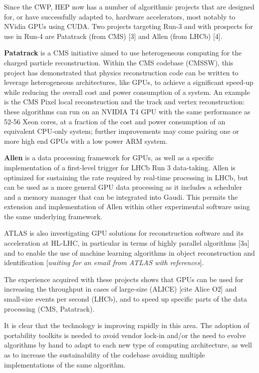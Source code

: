 \documentclass[10pt,a4paper]{article}
\begin{document}
Since the CWP, HEP now has a number of algorithmic projects that are
designed for, or have successfully adapted to, hardware accelerators,
most notably to NVidia GPUs using CUDA. Two projects targeting Run-3 and
with prospects for use in Run-4 are Patatrack (from CMS) {[}3{]} and
Allen (from LHCb) {[}4{]}.

\textbf{Patatrack} is a CMS initiative aimed to use heterogeneous
computing for the charged particle reconstruction. Within the CMS
codebase (CMSSW), this project has demonstrated that physics
reconstruction code can be written to leverage heterogeneous
architectures, like GPUs, to achieve a significant speed-up while
reducing the overall cost and power consumption of a system. An example
is the CMS Pixel local reconstruction and the track and vertex
reconstruction: these algorithms can run on an NVIDIA T4 GPU with the
same performance as 52-56 Xeon cores, at a fraction of the cost and
power consumption of an equivalent CPU-only system; further improvements
may come pairing one or more high end GPUs with a low power ARM system.

\textbf{Allen} is a data processing framework for GPUs, as well as a
specific implementation of a first-level trigger for LHCb Run 3
data-taking. Allen is optimized for sustaining the rate required by
real-time processing in LHCb, but can be used as a more general GPU data
processing as it includes a scheduler and a memory manager that can be
integrated into Gaudi. This permits the extension and implementation of
Allen within other experimental software using the same underlying
framework.

ATLAS is also investigating GPU solutions for reconstruction software
and its acceleration at HL-LHC, in particular in terms of highly
parallel algorithms {[}3a{]} and to enable the use of machine learning
algorithms in object reconstruction and identification {[}\emph{waiting
for an email from ATLAS with references}{]}.

The experience acquired with these projects shows that GPUs can be used
for increasing the throughput in cases of large-size (ALICE) {[}cite
Alice O2{]} and small-size events per second (LHCb), and to speed up
specific parts of the data processing (CMS, Patatrack).

It is clear that the technology is improving rapidly in this area. The
adoption of portability toolkits is needed to avoid vendor lock-in
and/or the need to evolve algorithms by hand to adapt to each new type
of computing architecture, as well as to increase the sustainability of
the codebase avoiding multiple implementations of the same algorithm.
\end{document}
